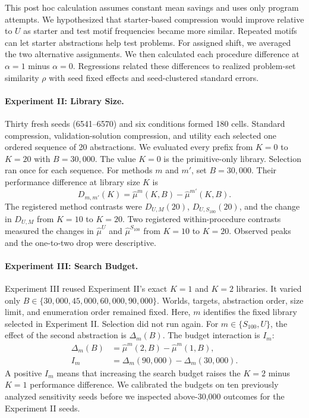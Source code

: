 \documentclass[10pt]{article}
\begin{document}
This post hoc calculation assumes constant mean savings and uses only program
attempts. We hypothesized that starter-based compression would improve relative
to $U$ as starter and test motif frequencies became more similar. Repeated
motifs can let starter abstractions help test problems. For assigned shift, we
averaged the two alternative assignments. We then calculated each procedure
difference at $\alpha=1$ minus $\alpha=0$.
Regressions related these differences to realized problem-set similarity $\rho$
with seed fixed effects and seed-clustered standard errors.

\paragraph{Experiment II: Library Size.}
Thirty fresh seeds (6541--6570) and six conditions formed 180 cells. Standard
compression, validation-solution compression, and utility each selected one
ordered sequence of 20 abstractions. We evaluated every prefix from $K=0$ to
$K=20$ with $B=30{,}000$. The value $K=0$ is the primitive-only library.
Selection ran once for each sequence.
For methods $m$ and $m'$, set $B=30{,}000$. Their performance difference at
library size $K$ is
\begin{equation}
  D_{m,m'}(K)
    =\widehat\mu^{m}(K,B)-\widehat\mu^{m'}(K,B).
\end{equation}
The registered method contrasts were $D_{U,M}(20)$,
$D_{U,S_{100}}(20)$, and the change in $D_{U,M}$ from $K=10$ to $K=20$.
Two registered within-procedure contrasts measured the changes in
$\widehat\mu^U$ and $\widehat\mu^{S_{100}}$ from $K=10$ to $K=20$.
Observed peaks and the one-to-two drop were descriptive.

\paragraph{Experiment III: Search Budget.}
Experiment III reused Experiment II's exact $K=1$ and $K=2$ libraries. It varied
only $B\in\{30{,}000,45{,}000,60{,}000,90{,}000\}$. Worlds, targets,
abstraction order, size limit, and enumeration order remained fixed. Here, $m$
identifies the fixed library selected in Experiment II. Selection did not run
again. For $m\in\{S_{100},U\}$, the effect of the second abstraction is
$\Delta_m(B)$. The budget interaction is $I_m$:
\begin{equation}
  \begin{aligned}
    \Delta_m(B)
      &=\widehat\mu^m(2,B)-\widehat\mu^m(1,B),\\
    I_m
      &=\Delta_m(90{,}000)-\Delta_m(30{,}000).
  \end{aligned}
\end{equation}
A positive $I_m$ means that increasing the search budget raises the $K=2$ minus
$K=1$ performance difference. We calibrated the budgets on ten previously
analyzed sensitivity seeds before we inspected above-30,000 outcomes for the
Experiment II seeds.
\end{document}
